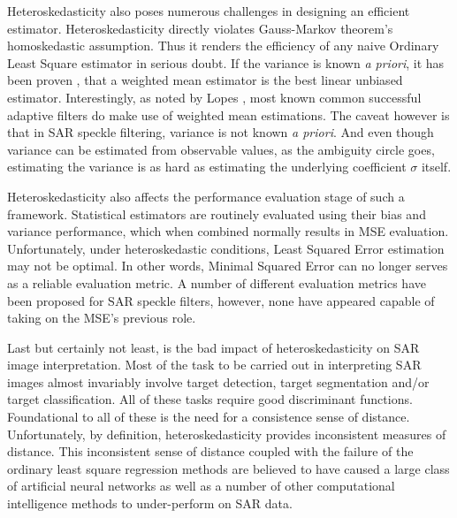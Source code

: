 Heteroskedasticity also poses numerous challenges in designing an efficient estimator. Heteroskedasticity directly violates Gauss-Markov theorem's homoskedastic assumption. 
Thus it renders the efficiency of any naive Ordinary Least Square estimator in serious doubt. 
If the variance is known \textit{a priori}, it has been proven \cite{Aitken_1934_ProcsRoyalSocEdinburg}, that a weighted mean estimator is the best linear unbiased estimator. 
Interestingly, as noted by Lopes \cite{Lopes_TGRS_1990}, most known common successful adaptive filters \cite{Lee_PAMI_1980, Kuan_1985_PAMI, Frost_PAMI_1982} do make use of weighted mean estimations. 
The caveat however is that in SAR speckle filtering, variance is not known \textit{a priori}. 
And even though variance can be estimated from observable values, as the ambiguity circle goes, estimating the variance is as hard as estimating the underlying coefficient $\sigma$ itself.

Heteroskedasticity also affects the performance evaluation stage of such a framework.
Statistical estimators are routinely evaluated using their bias and variance performance,
  which when combined normally results in MSE evaluation.
Unfortunately, under heteroskedastic conditions, Least Squared Error estimation may not be optimal.   
In other words, Minimal Squared Error can no longer serves as a reliable evaluation metric.
A number of different evaluation metrics have been proposed for SAR speckle filters,
  however, none have appeared capable of taking on the MSE's previous role.


Last but certainly not least, is the bad impact of heteroskedasticity on SAR image interpretation. 
Most of the task to be carried out in interpreting SAR images almost invariably involve target detection, target segmentation and/or target classification. 
All of these tasks require good discriminant functions. 
Foundational to all of these is the need for a consistence sense of distance. 
Unfortunately, by definition, heteroskedasticity provides inconsistent measures of distance. 
This inconsistent sense of distance coupled with the failure of the ordinary least square regression methods are believed to have caused a large class of artificial neural networks as well as a number of other computational intelligence methods to under-perform on SAR data.

